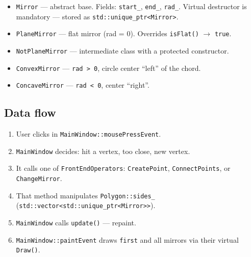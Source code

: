 \documentclass[a4paper,11pt]{article}
\newcommand{\code}[1]{\texttt{#1}}
\begin{document}
\begin{center}
\end{center}

\begin{itemize}[leftmargin=*]
    \item \code{Mirror} — abstract base. Fields:
          \code{start\_}, \code{end\_}, \code{rad\_}.
          Virtual destructor is mandatory — stored as
          \code{std::unique\_ptr<Mirror>}.
    \item \code{PlaneMirror} — flat mirror (rad = 0). Overrides
          \code{isFlat()} $\to$ \code{true}.
    \item \code{NotPlaneMirror} — intermediate class with a protected
          constructor.
    \item \code{ConvexMirror} — \code{rad > 0}, circle center ``left''
          of the chord.
    \item \code{ConcaveMirror} — \code{rad < 0}, center ``right''.
\end{itemize}

\subsection{Data flow}

\begin{enumerate}[leftmargin=*]
    \item User clicks in \code{MainWindow::mousePressEvent}.
    \item \code{MainWindow} decides: hit a vertex, too close, new vertex.
    \item It calls one of \code{FrontEndOperators}: \code{CreatePoint},
          \code{ConnectPoints}, or \code{ChangeMirror}.
    \item That method manipulates \code{Polygon::sides\_}
          (\code{std::vector<std::unique\_ptr<Mirror>>}).
    \item \code{MainWindow} calls \code{update()} — repaint.
    \item \code{MainWindow::paintEvent} draws \code{first} and all mirrors
          via their virtual \code{Draw()}.
\end{enumerate}
\end{document}
